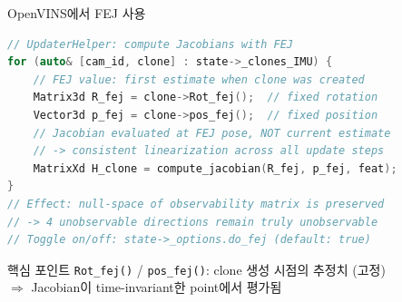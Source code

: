 \begin{frame}[fragile,shrink=10]{OpenVINS에서 FEJ 사용}
\begin{lstlisting}[language=C++]
// UpdaterHelper: compute Jacobians with FEJ
for (auto& [cam_id, clone] : state->_clones_IMU) {
    // FEJ value: first estimate when clone was created
    Matrix3d R_fej = clone->Rot_fej();  // fixed rotation
    Vector3d p_fej = clone->pos_fej();  // fixed position
    // Jacobian evaluated at FEJ pose, NOT current estimate
    // -> consistent linearization across all update steps
    MatrixXd H_clone = compute_jacobian(R_fej, p_fej, feat);
}
// Effect: null-space of observability matrix is preserved
// -> 4 unobservable directions remain truly unobservable
// Toggle on/off: state->_options.do_fej (default: true)
\end{lstlisting}
  \begin{block}{핵심 포인트}
    \texttt{Rot\_fej()} / \texttt{pos\_fej()}: clone 생성 시점의 추정치 (고정)\\
    $\Rightarrow$ Jacobian이 time-invariant한 point에서 평가됨
  \end{block}
\end{frame}


